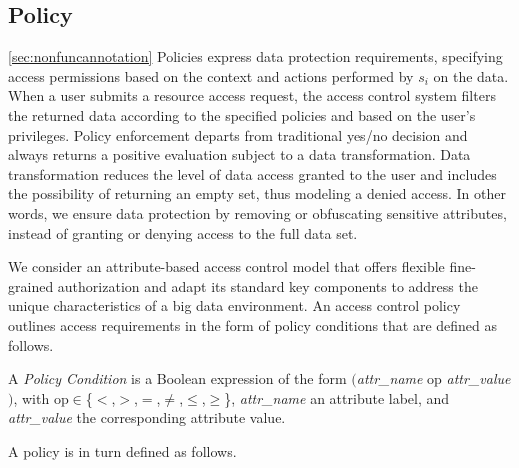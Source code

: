 \subsection{Policy}\ref{sec:nonfuncannotation}
Policies express data protection requirements, specifying access permissions based on the context and actions performed by $s_i$ on the data. 
When a user submits a resource access request, the access control system filters the returned data according to the specified policies and based on the user's privileges. Policy enforcement departs from traditional yes/no decision and always returns a positive evaluation subject to a data transformation. Data transformation reduces the level of data access granted to the user and includes the possibility of returning an empty set, thus modeling a denied access.
In other words, we ensure data protection by removing or obfuscating sensitive attributes, instead of granting or denying access to the full data set.

We consider an attribute-based access control model that offers flexible fine-grained authorization and adapt its standard key components to address the unique characteristics of a big data environment.
An access control policy outlines access requirements in the form of policy conditions that are defined as follows.

\begin{definition}\label{def:policy_cond}
  A \emph{Policy Condition} is a Boolean expression of the form $($\emph{attr\_name} op \emph{attr\_value}$)$, with op$\in$\{$<$,$>$,$=$,$\neq$,$\leq$,$\geq$\}, \emph{attr\_name} an attribute label, and \emph{attr\_value} the corresponding attribute value.
\end{definition}

A policy is in turn defined as follows.

